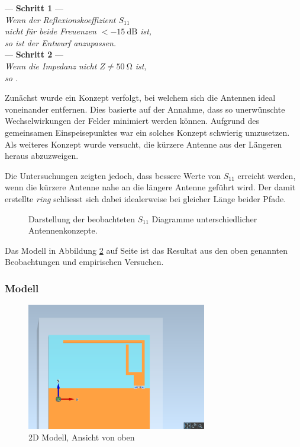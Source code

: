 \begin{center}
	--- \textbf{Schritt 1} --- \\
	\emph{
		Wenn der Reflexionskoeffizient $S_{11}$ \\
		nicht für beide Freuenzen $< \SI{-15}{\dB}$ ist, \\
		so ist der Entwurf anzupassen.} \\
	--- \textbf{Schritt 2} --- \\
	\emph{
		Wenn die Impedanz nicht $Z \neq \SI{50}{\ohm}$ ist, \\
		so .} \\
\end{center}

Zunächst wurde ein Konzept verfolgt, bei welchem sich die Antennen
ideal voneinander entfernen. Dies basierte auf der Annahme, dass so unerwünschte
Wechselwirkungen der Felder minimiert werden können. Aufgrund des gemeinsamen
Einspeisepunktes war ein solches Konzept schwierig umzusetzen. Als weiteres
Konzept wurde versucht, die kürzere Antenne aus der Längeren heraus
abzuzweigen.

Die Untersuchungen zeigten jedoch, dass bessere Werte von $S_{11}$
erreicht werden, wenn die kürzere Antenne nahe an die längere Antenne
geführt wird. Der damit erstellte \emph{ring} schliesst sich dabei
idealerweise bei gleicher Länge beider Pfade.

\begin{figure}[h!]
	\centering
	\footnotesize
	\def\svgscale{0.75}
	
	\caption{Darstellung der beobachteten $S_{11}$ Diagramme unterschiedlicher Antennenkonzepte.}
	\label{fig:antenna_concept_1}
\end{figure}

Das Modell in Abbildung \ref{fig:modell} auf Seite \pageref{fig:modell} ist das Resultat aus den oben genannten Beobachtungen und empirischen Versuchen. 

\subsubsection{Modell}

\begin{figure}[h!]
	\centering
	\includegraphics[width=0.7\textwidth]{../fig/plt/crazy_stuff_l4_pcb_v2c_laptop_1a_105_5ghz_3d_pcb_xy.png}
	\caption{2D Modell, Ansicht von oben}
	\label{fig:modell}
\end{figure}

